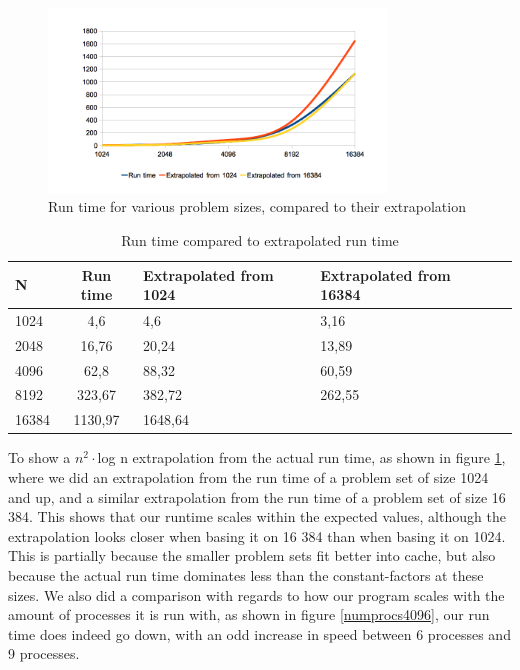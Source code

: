 \begin{figure}[H]
  \centering
    \includegraphics[width=0.8\textwidth]{speed_over_size_3.png}
    \caption{Run time for various problem sizes, compared to their extrapolation}
    \label{runsize}
\end{figure}

\begin{table}[ht]
  \centering
    \begin{tabular}{l | c | p{3cm} | p{3cm} | c}
        N & Run time & Extrapolated from 1024 & Extrapolated from 16384 \\
        \hline
        1024 & 4,6 & 4,6 & 3,16\\
        2048 & 16,76 & 20,24 & 13,89 \\
        4096 & 62,8	 & 88,32 & 60,59 \\
        8192 & 323,67 & 382,72 & 262,55 \\
        16384 & 1130,97 & 1648,64  \\
        \hline
    \end{tabular}
    \caption{Run time compared to extrapolated run time}
\end{table}

To show a $n^2\cdot$log n extrapolation from the actual run time, as shown in figure \ref{runsize}, where we did an extrapolation from the run time of a problem set of size 1024 and up, and a similar extrapolation from the run time of a problem set of size 16 384. This shows that our runtime scales within the expected values, although the extrapolation looks closer when basing it on 16 384 than when basing it on 1024. This is partially because the smaller problem sets fit better into cache, but also because the actual run time dominates less than the constant-factors at these sizes.
\FloatBarrier
We also did a comparison with regards to how our program scales with the amount of processes it is run with,
as shown in figure \ref{numprocs4096}, our run time does indeed go down, with an odd increase in speed between 6 processes and 9 processes.

